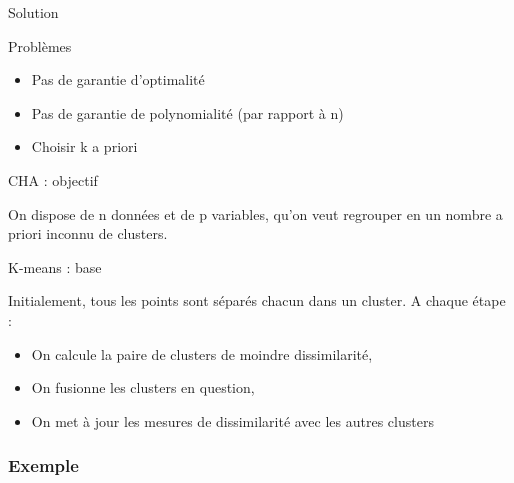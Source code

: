 \documentclass[11pt]{beamer}
\newenvironment{slide}[1]{%
\begin{frame}[environment=slide]
\frametitle{#1}
}{%
\end{frame}
}
\newcommand{\Pythonsmall}[1]{
	{\scriptsize }
}
\begin{document}
\begin{frame}{Solution}
\Pythonsmall{ex501bis}
\end{frame}


\begin{frame}{Problèmes}

\begin{itemize}
	\item Pas de garantie d'optimalité
	\item Pas de garantie de polynomialité (par rapport à n)
	\item Choisir k a priori
\end{itemize}

\end{frame}



\begin{frame}{CHA : objectif}

On dispose de n données et de p variables, qu'on veut regrouper en un nombre a priori inconnu de clusters.\\

\end{frame}

\begin{frame}{K-means : base}

Initialement, tous les points sont séparés chacun dans un cluster. A chaque étape :
\pause
\begin{itemize}
	\item On calcule la paire de clusters de moindre dissimilarité,
	\item On fusionne les clusters en question,
	\item On met à jour les mesures de dissimilarité avec les autres clusters
\end{itemize}

\end{frame}

\begin{slide}{Exemple}


\end{slide}
\end{document}
